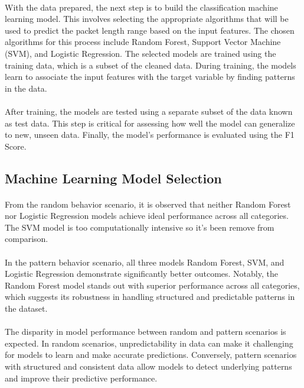 \documentclass[10pt]{article}
\begin{document}
\paragraph{}
With the data prepared, the next step is to build the classification machine learning model. This involves selecting the appropriate algorithms that will be used to predict the packet length range based on the input features. The chosen algorithms for this process include Random Forest, Support Vector Machine (SVM), and Logistic Regression. The selected models are trained using the training data, which is a subset of the cleaned data. During training, the models learn to associate the input features with the target variable by finding patterns in the data.

\paragraph{}
After training, the models are tested using a separate subset of the data known as test data. This step is critical for assessing how well the model can generalize to new, unseen data. Finally, the model's performance is evaluated using the F1 Score.

\newpage
\subsection{Machine Learning Model Selection}
\paragraph{}
From the random behavior scenario, it is observed that neither Random Forest nor Logistic Regression models achieve ideal performance across all categories. The SVM model is too computationally intensive so it's been remove from comparison.

\paragraph{}
In the pattern behavior scenario, all three models Random Forest, SVM, and Logistic Regression demonstrate significantly better outcomes. Notably, the Random Forest model stands out with superior performance across all categories, which suggests its robustness in handling structured and predictable patterns in the dataset.

\paragraph{}
The disparity in model performance between random and pattern scenarios is expected. In random scenarios, unpredictability in data can make it challenging for models to learn and make accurate predictions. Conversely, pattern scenarios with structured and consistent data allow models to detect underlying patterns and improve their predictive performance.
\end{document}
